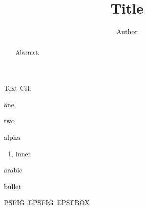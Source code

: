 \documentclass{ws-mpla}
\begin{document}
\title{Title}
\author{Author}
\begin{abstract}Abstract.\end{abstract}
Text C\cdash H.
\begin{romanlist}\item one\item two\end{romanlist}
\begin{alphlist}\item alpha\begin{enumerate}\item inner\end{enumerate}\end{alphlist}
\begin{arabiclist}\item arabic\end{arabiclist}
\begin{itemlist}\item bullet\end{itemlist}
\ifdefined\psfig PSFIG\fi\ \ifdefined\epsfig EPSFIG\fi\ \ifdefined\epsfbox EPSFBOX\fi
\end{document}
